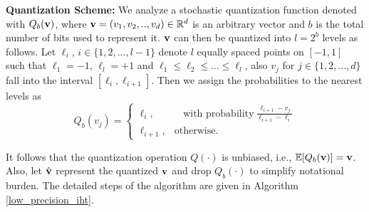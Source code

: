 \documentclass{article}
\begin{document}
{\bf Quantization Scheme:} We analyze a stochastic quantization function denoted with $Q_b({\bf v})$, where ${\bf v}=(v_1, v_2, .., v_d) \in \mathbb{R}^d$ is an arbitrary vector and $b$ is the total number of bits used to represent it. ${\bf v}$ can then be quantized into $l=2^b$ levels as follows. Let $\ell_i$, $i\in \{1, 2, ..., l-1 \}$ denote $l$ equally spaced points on $[-1, 1]$ such that $\ell_1= -1$, $\ell_l= +1$ and $\ell_1\leq\ell_2 \leq ... \leq \ell_l$, also $v_j$ for $j\in \{1, 2, ..., d \}$ fall into the interval $[\ell_i, \ell_{i+1}]$. Then we assign the probabilities to the nearest levels as
\[
    Q_b(v_j) = \begin{cases}
        \ell_i, & \ \ \ \ \textrm{with probability} \ \frac{\ell_{i+1}-v_j}{\ell_{i+1}-\ell_i}\\
        \ell_{i+1},&\textrm{otherwise}.  \ \ \ \  \ \ \ \ \ \ \ \ \ \ \ \ \ \ 
        \end{cases} %
\]
  
It follows that the quantization operation $Q(\cdot)$ is unbiased, i.e., $\mathbb{E}[Q_b({\bf v})] = {\bf v}$. Also, let $\hat{{\bf v}}$ represent the quantized ${\bf v}$ and drop $Q_b(\cdot)$ to simplify notational burden. The detailed steps of the algorithm are given in Algorithm \ref{low_precision_iht}.

\end{document}
